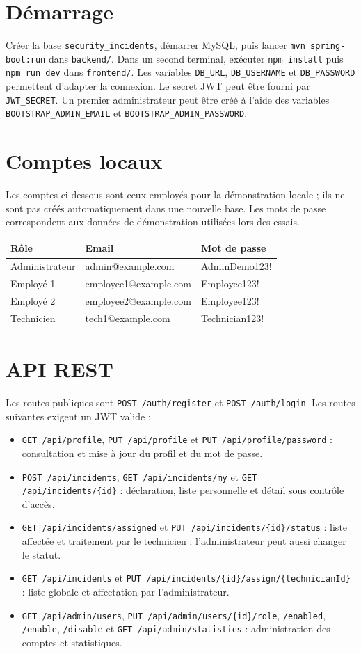 \documentclass[12pt,a4paper]{report}
\begin{document}
\section{Démarrage}
Créer la base \texttt{security\_incidents}, démarrer MySQL, puis lancer \texttt{mvn spring-boot:run} dans \texttt{backend/}. Dans un second terminal, exécuter \texttt{npm install} puis \texttt{npm run dev} dans \texttt{frontend/}. Les variables \texttt{DB\_URL}, \texttt{DB\_USERNAME} et \texttt{DB\_PASSWORD} permettent d'adapter la connexion. Le secret JWT peut être fourni par \texttt{JWT\_SECRET}. Un premier administrateur peut être créé à l'aide des variables \texttt{BOOTSTRAP\_ADMIN\_EMAIL} et \texttt{BOOTSTRAP\_ADMIN\_PASSWORD}.
\section{Comptes locaux}
Les comptes ci-dessous sont ceux employés pour la démonstration locale ; ils ne sont pas créés automatiquement dans une nouvelle base. Les mots de passe correspondent aux données de démonstration utilisées lors des essais.
\begin{center}\small\begin{tabular}{lll}\toprule Rôle & Email & Mot de passe\\\midrule Administrateur & admin@example.com & AdminDemo123!\\ Employé 1 & employee1@example.com & Employee123!\\ Employé 2 & employee2@example.com & Employee123!\\ Technicien & tech1@example.com & Technician123!\\\bottomrule\end{tabular}\end{center}
\section{API REST}
Les routes publiques sont \texttt{POST /auth/register} et \texttt{POST /auth/login}. Les routes suivantes exigent un JWT valide :
\begin{itemize}
\item \texttt{GET /api/profile}, \texttt{PUT /api/profile} et \texttt{PUT /api/profile/password} : consultation et mise à jour du profil et du mot de passe.
\item \texttt{POST /api/incidents}, \texttt{GET /api/incidents/my} et \texttt{GET /api/incidents/\{id\}} : déclaration, liste personnelle et détail sous contrôle d'accès.
\item \texttt{GET /api/incidents/assigned} et \texttt{PUT /api/incidents/\{id\}/status} : liste affectée et traitement par le technicien ; l'administrateur peut aussi changer le statut.
\item \texttt{GET /api/incidents} et \texttt{PUT /api/incidents/\{id\}/assign/\{technicianId\}} : liste globale et affectation par l'administrateur.
\item \texttt{GET /api/admin/users}, \texttt{PUT /api/admin/users/\{id\}/role}, \texttt{/enabled}, \texttt{/enable}, \texttt{/disable} et \texttt{GET /api/admin/statistics} : administration des comptes et statistiques.
\end{itemize}
\end{document}
